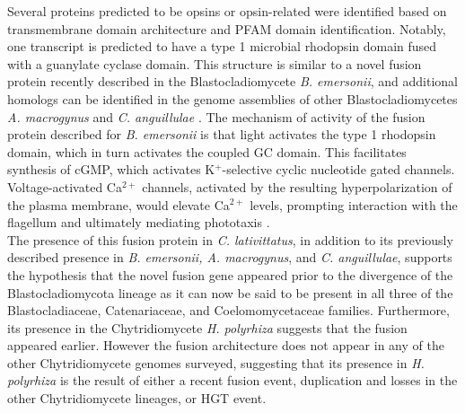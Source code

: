 \indent Several proteins predicted to be opsins or opsin-related were identified based on transmembrane domain architecture and PFAM domain identification. Notably, one transcript is predicted to have a type 1 microbial rhodopsin domain fused with a guanylate cyclase domain. This structure is similar to a novel fusion protein recently described in the Blastocladiomycete \textit{B. emersonii}, and additional homologs can be identified in the genome assemblies of other Blastocladiomycetes \textit{A. macrogynus} and \textit{C.  anguillulae} \cite{Avelar2014}. The mechanism of activity of the fusion protein described for \textit{B. emersonii} is that light activates the type 1 rhodopsin domain, which in turn activates the coupled GC domain. This facilitates synthesis of cGMP, which activates K$^{+}$-selective cyclic nucleotide gated channels. Voltage-activated Ca$^{2+}$ channels, activated by the resulting hyperpolarization of the plasma membrane, would elevate Ca$^{2+}$ levels, prompting interaction with the flagellum and ultimately mediating phototaxis \cite{Avelar2014}. \\
\indent The presence of this fusion protein in \textit{C. lativittatus}, in addition to its previously described presence in \textit{B. emersonii, A. macrogynus}, and \textit{C. anguillulae}, supports the hypothesis that the novel fusion gene appeared prior to the divergence of the Blastocladiomycota lineage as it can now be said to be present in all three of the Blastocladiaceae, Catenariaceae, and Coelomomycetaceae families. Furthermore, its presence in the Chytridiomycete \textit{H. polyrhiza} suggests that the fusion appeared earlier. However the fusion architecture does not appear in any of the other Chytridiomycete genomes surveyed, suggesting that its presence in \textit{H. polyrhiza} is the result of either a recent fusion event, duplication and losses in the other Chytridiomycete lineages, or HGT event.\\
